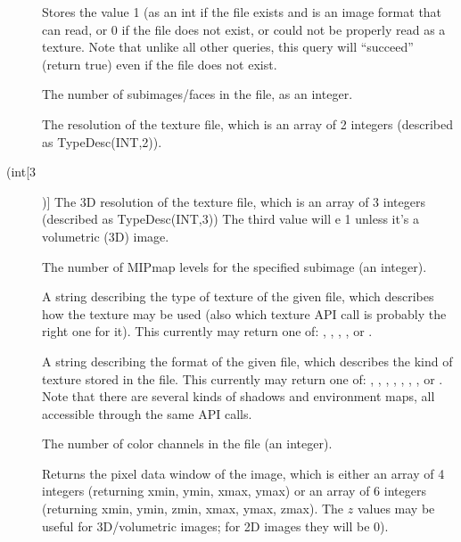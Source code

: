 \begin{description}
\item[\spc] \spc \vspace{-12pt} 

\item[\rm {}] Stores the value 1 (as an {\cf int} if the file
exists and is an image format that \product can read, or 0 if the file
does not exist, or could not be properly read as a texture. Note that
unlike all other queries, this query will ``succeed'' (return {\cf true})
even if the file does not exist.

\item[\rm {}] The number of subimages/faces in the file, as an integer.

\item[\rm {}] The resolution of the texture file, which
is an array of 2 integers (described as {\cf TypeDesc(INT,2)}).

\item[\rm {} (int[3])] The 3D resolution of the texture file, which
is an array of 3 integers (described as {\cf TypeDesc(INT,3)})  The
third value will e 1 unless it's a volumetric (3D) image.

\item[\rm {}] The number of MIPmap levels for the specified
subimage (an integer).

\item[\rm {}] A string describing the type of texture
of the given file, which describes how the texture may be used (also
which texture API call is probably the right one for it).
This currently may return one of: , ,
, , 
or .

\item[\rm {}] A string describing the format of the
given file, which describes the kind of texture stored in the file.
This currently may return one of: , ,
, , , , , or .
Note that there are several kinds of shadows and environment maps,
all accessible through the same API calls.

\item[\rm {}] The number of color channels in the file 
(an integer).

\item[\rm {}] 
Returns the pixel data window of the image, which is either an array of 4
integers (returning xmin, ymin, xmax, ymax) or an array of 6 integers
(returning xmin, ymin, zmin, xmax, ymax, zmax). The $z$ values may be useful
for 3D/volumetric images; for 2D images they will be 0).


\end{description}
